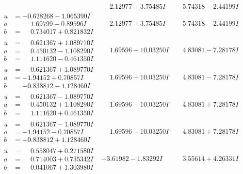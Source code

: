 \documentclass[1p]{elsarticle_modified}
\theoremstyle{definition}
\begin{document}
$$\begin{array}{c|c|c}
 & \phantom{-}2.12977 + 3.75485 I & \phantom{-}5.74318 - 2.44199 I \\ \hline\begin{aligned}
u &= -0.628268 - 1.065390 I \\
a &= \phantom{-}1.69799 - 0.89596 I \\
b &= \phantom{-}0.734017 + 0.821832 I\end{aligned}
 & \phantom{-}2.12977 + 3.75485 I & \phantom{-}5.74318 - 2.44199 I \\ \hline\begin{aligned}
u &= \phantom{-}0.621367 + 1.089770 I \\
a &= \phantom{-}0.450132 - 1.108290 I \\
b &= \phantom{-}1.111620 - 0.461350 I\end{aligned}
 & \phantom{-}1.69596 + 10.03250 I & \phantom{-}4.83081 - 7.28178 I \\ \hline\begin{aligned}
u &= \phantom{-}0.621367 + 1.089770 I \\
a &= -1.94152 + 0.70857 I \\
b &= -0.838812 - 1.128460 I\end{aligned}
 & \phantom{-}1.69596 + 10.03250 I & \phantom{-}4.83081 - 7.28178 I \\ \hline\begin{aligned}
u &= \phantom{-}0.621367 - 1.089770 I \\
a &= \phantom{-}0.450132 + 1.108290 I \\
b &= \phantom{-}1.111620 + 0.461350 I\end{aligned}
 & \phantom{-}1.69596 - 10.03250 I & \phantom{-}4.83081 + 7.28178 I \\ \hline\begin{aligned}
u &= \phantom{-}0.621367 - 1.089770 I \\
a &= -1.94152 - 0.70857 I \\
b &= -0.838812 + 1.128460 I\end{aligned}
 & \phantom{-}1.69596 - 10.03250 I & \phantom{-}4.83081 + 7.28178 I \\ \hline\begin{aligned}
u &= \phantom{-}0.558047 + 0.271580 I \\
a &= \phantom{-}0.714003 + 0.735342 I \\
b &= \phantom{-}0.041067 + 1.303980 I\end{aligned}
 & -3.61982 - 1.83292 I & \phantom{-}3.55614 + 4.26331 I \\ \hline\begin{aligned}

\end{aligned}
\end{array}$$
\end{document}
